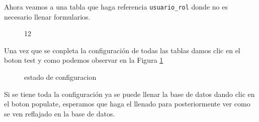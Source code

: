 Ahora veamos a una tabla que haga referencia \texttt{usuario\_rol} donde no es necesario llenar formularios.
\begin{figure}[H]
\caption{12}
\centering
{}
\end{figure}
Una vez que se conpleta la configuraci\'on de todas las tablas damos clic en el boton test y como podemos observar en la Figura \ref{fig:statusConnection}
\begin{figure}[H]
\caption{estado de configuracion}\label{fig:statusConnection}
\centering
{}
\end{figure}
 Si se tiene toda la configuraci\'on ya se puede llenar la base de datos dando clic en el boton populate, esperamos que haga el llenado para posteriormente ver como se ven reflajado en la base de datos.
 
